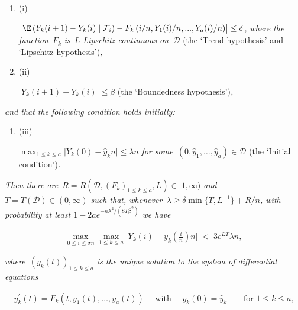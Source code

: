 \begin{enumerate}


\item[] (i) 


$\bigl|\E\left(Y_{k}(i+1)-Y_{k}(i)\mid\mathcal{F}_{i}\right)-F_{k}\left(i/n,Y_{1}(i)/n,...,Y_{a}(i)/n\right)\bigr|\leq\delta$\emph{,
where the function }$F_{k}$\emph{ is }$L$\emph{-Lipschitz-continuous on }$\mathcal{D}$\emph{  }(the ‘Trend hypothesis’ and ‘Lipschitz hypothesis’)\emph{,}\par




\item[] (ii) 


$\bigl|Y_{k}(i+1)-Y_{k}(i)\bigr|\leq\beta$\emph{  }(the ‘Boundedness hypothesis’)\emph{,}\par




\end{enumerate}


\emph{and that the following condition holds initially:}\par


\begin{enumerate}


\item[] (iii) 


$\max_{1\leq k\leq a}\bigl|Y_{k}(0)-\hat{y}_{k}n\bigr|\leq\lambda n$\emph{ for some }$(0,\hat{y}_{1},\ldots,\hat{y}_{a})\in\mathcal{D}$\emph{
 }(the ‘Initial condition’)\emph{.}\par




\end{enumerate}


\emph{Then there are $R=R(\mathcal{D},(F_{k})_{1\leq k\leq a},L)\in[1,\infty)$ and $T=T(\mathcal{D})\in(0,\infty)$ such that,
whenever $\lambda\geq\delta\min\{T,L^{-1}\}+R/n$,
with probability at least $1-2ae^{-n\lambda^{2}/(8T\beta^{2})}$ we have}\par


\[\begin{gathered}
\max_{0\leq i\leq\sigma n}\max_{1\leq k\leq a}\bigl|Y_{k}(i)-y_{k}\left(\tfrac{i}{n}\right)n\bigr|\;<\;3e^{LT}\lambda n,
\end{gathered}\]


\emph{where $(y_{k}(t))_{1\leq k\leq a}$ is the unique solution to the system of differential equations}\par


\[\begin{gathered}
y^{\prime}_{k}(t)=F_{k}\left(t,y_{1}(t),\ldots,y_{a}(t)\right)\quad\text{ with }\quad y_{k}(0)=\hat{y}_{k}\qquad\text{for~$1\leq k\leq a$,}
\end{gathered}\]


